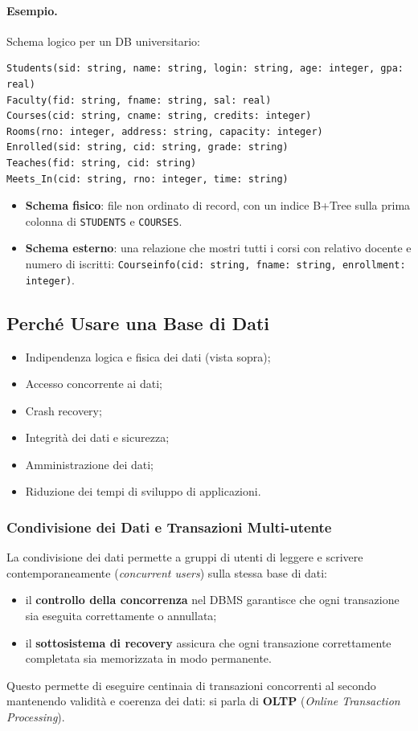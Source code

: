 \documentclass[12pt, a4paper]{article}
\begin{document}
\paragraph{Esempio.} Schema logico per un DB universitario:
\begin{verbatim}
Students(sid: string, name: string, login: string, age: integer, gpa: real)
Faculty(fid: string, fname: string, sal: real)
Courses(cid: string, cname: string, credits: integer)
Rooms(rno: integer, address: string, capacity: integer)
Enrolled(sid: string, cid: string, grade: string)
Teaches(fid: string, cid: string)
Meets_In(cid: string, rno: integer, time: string)
\end{verbatim}
\begin{itemize}
    \item \textbf{Schema fisico}: file non ordinato di record, con un indice B+Tree sulla prima colonna di \texttt{STUDENTS} e \texttt{COURSES}.
    \item \textbf{Schema esterno}: una relazione che mostri tutti i corsi con relativo docente e numero di iscritti: \texttt{Courseinfo(cid: string, fname: string, enrollment: integer)}.
\end{itemize}

\subsection{Perché Usare una Base di Dati}

\begin{itemize}
    \item Indipendenza logica e fisica dei dati (vista sopra);
    \item Accesso concorrente ai dati;
    \item Crash recovery;
    \item Integrità dei dati e sicurezza;
    \item Amministrazione dei dati;
    \item Riduzione dei tempi di sviluppo di applicazioni.
\end{itemize}

\subsubsection{Condivisione dei Dati e Transazioni Multi-utente}
La condivisione dei dati permette a gruppi di utenti di leggere e scrivere contemporaneamente (\textit{concurrent users}) sulla stessa base di dati:
\begin{itemize}
    \item il \textbf{controllo della concorrenza} nel DBMS garantisce che ogni transazione sia eseguita correttamente o annullata;
    \item il \textbf{sottosistema di recovery} assicura che ogni transazione correttamente completata sia memorizzata in modo permanente.
\end{itemize}
Questo permette di eseguire centinaia di transazioni concorrenti al secondo mantenendo validità e coerenza dei dati: si parla di \textcolor{tocsec}{\textbf{OLTP}} (\textit{Online Transaction Processing}).
\end{document}
